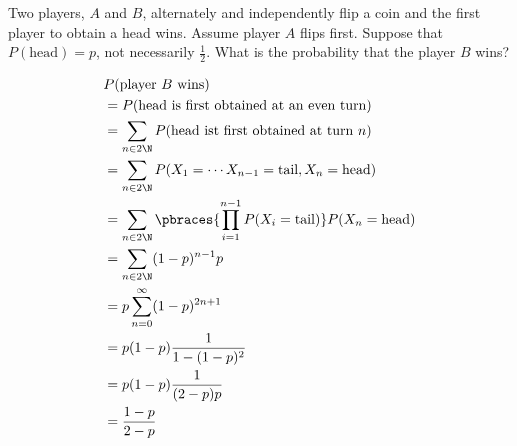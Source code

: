 
\begin{exercise}

Two players, $A$ and $B$, alternately and independently flip a coin and the first player to obtain a head wins.
Assume player $A$ flips first.
Suppose that $P(\text{head}) = p$, not necessarily $\frac{1}{2}$.
What is the probability that the player $B$ wins?

\end{exercise}


\begin{solution}

\phantom{}

\begin{align*}
    &
    P(\text{player $B$ wins}) \\
    & =
    P(\text{head is first obtained at an even turn}) \\
    & =
    \sum_{n \in 2 \N}
        P(\text{head ist first obtained at turn $n$}) \\
    & =
    \sum_{n \in 2 \N}
        P(X_1 = \cdots X_{n-1} = \text{tail}, X_n = \text{head}) \\
    & =
    \sum_{n \in 2 \N}
        \pbraces
        {
            \prod_{i=1}^{n-1}
                P(X_i = \text{tail})
        }
        P(X_n = \text{head}) \\
    & =
    \sum_{n \in 2 \N}
        (1 - p)^{n-1} p \\
    & =
    p \sum_{n=0}^\infty (1 - p)^{2 n + 1} \\
    & =
    p (1 - p) \frac{1}{1 - (1 - p)^2} \\
    & =
    p (1 - p) \frac{1}{(2 - p) p} \\
    & =
    \frac{1 - p}{2 - p}
\end{align*}

\end{solution}

